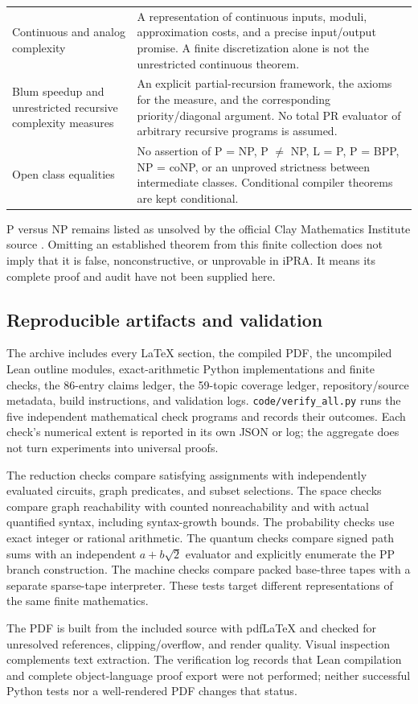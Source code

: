 \begin{longtable}{p{}p{}}
Continuous and analog complexity & A representation of continuous inputs, moduli, approximation costs, and a precise input/output promise. A finite discretization alone is not the unrestricted continuous theorem. \\
Blum speedup and unrestricted recursive complexity measures & An explicit partial-recursion framework, the axioms for the measure, and the corresponding priority/diagonal argument. No total PR evaluator of arbitrary recursive programs is assumed. \\
Open class equalities & No assertion of P = NP, P $\ne$ NP, L = P, P = BPP, NP = coNP, or an unproved strictness between intermediate classes. Conditional compiler theorems are kept conditional. \\
\bottomrule
\end{longtable}
P versus NP remains listed as unsolved by the official Clay Mathematics Institute source \cite{ClayPNP}. Omitting an established theorem from this finite collection does not imply that it is false, nonconstructive, or unprovable in iPRA. It means its complete proof and audit have not been supplied here.

\subsection{Reproducible artifacts and validation}
The archive includes every LaTeX section, the compiled PDF, the uncompiled Lean outline modules, exact-arithmetic Python implementations and finite checks, the 86-entry claims ledger, the 59-topic coverage ledger, repository/source metadata, build instructions, and validation logs. \texttt{code/verify\_all.py} runs the five independent mathematical check programs and records their outcomes. Each check's numerical extent is reported in its own JSON or log; the aggregate does not turn experiments into universal proofs.

The reduction checks compare satisfying assignments with independently evaluated circuits, graph predicates, and subset selections. The space checks compare graph reachability with counted nonreachability and with actual quantified syntax, including syntax-growth bounds. The probability checks use exact integer or rational arithmetic. The quantum checks compare signed path sums with an independent $a+b\sqrt2$ evaluator and explicitly enumerate the PP branch construction. The machine checks compare packed base-three tapes with a separate sparse-tape interpreter. These tests target different representations of the same finite mathematics.

The PDF is built from the included source with pdfLaTeX and checked for unresolved references, clipping/overflow, and render quality. Visual inspection complements text extraction. The verification log records that Lean compilation and complete object-language proof export were not performed; neither successful Python tests nor a well-rendered PDF changes that status.
